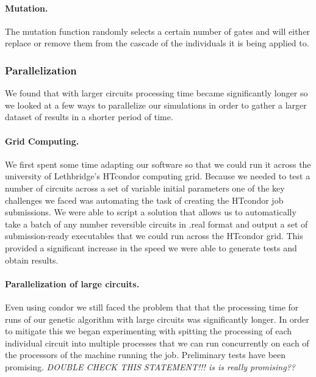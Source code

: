 \paragraph{Mutation.}

The mutation function randomly selects a certain number of gates and will either replace or remove them from the cascade of the 
individuals it is being applied to.




\subsubsection{Parallelization}

We found that with larger circuits processing time became significantly longer so we looked at a few ways to parallelize our simulations 
in order to gather a larger dataset of results in a shorter period of time.

\paragraph{Grid Computing.}

We first spent some time adapting our software so that we could run it across the university of Lethbridge's HTcondor computing grid. 
Because we needed to test a number of circuits across a set of variable initial parameters one of the key challenges we faced was 
automating the task of creating the HTcondor job submissions. We were able to script a solution that allows us to automatically take 
a batch of any number reversible circuits in .real format and output a set of submission-ready executables that we could run across 
the HTcondor grid. This provided a significant increase in the speed we were able to generate tests and obtain results.

\paragraph{Parallelization of large circuits.}

Even using condor we still faced the problem that that the processing time for runs of our genetic algorithm with large circuits was 
significantly longer. In order to mitigate this we began experimenting with spitting the processing of each individual circuit into 
multiple processes that we can run concurrently on each of the processors of the machine running the job. Preliminary tests have been 
promising.   \emph{  DOUBLE CHECK THIS STATEMENT!!! is is really promising??}